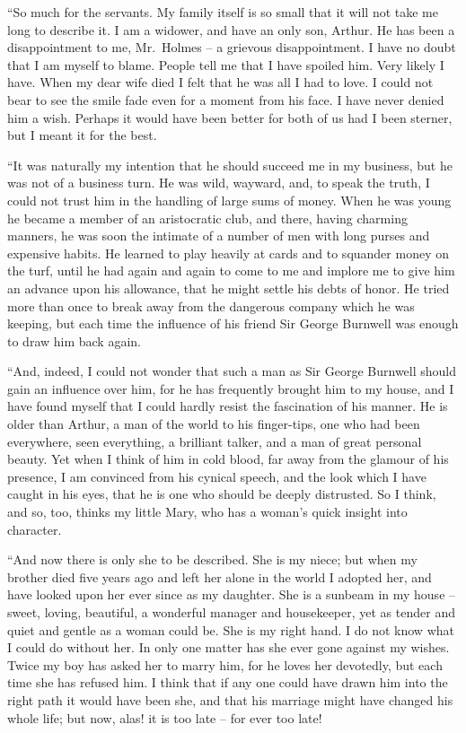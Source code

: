 “So much for the servants. My family itself is so small
that it will not take me long to describe it. I am a widower,
and have an only son, Arthur. He has been a disappointment
to me, Mr.~Holmes -- a grievous disappointment. I have
no doubt that I am myself to blame. People tell me that I
have spoiled him. Very likely I have. When my dear wife
died I felt that he was all I had to love. I could not bear to
see the smile fade even for a moment from his face. I have
never denied him a wish. Perhaps it would have been better
for both of us had I been sterner, but I meant it for the best.

“It was naturally my intention that he should succeed me
in my business, but he was not of a business turn. He was
wild, wayward, and, to speak the truth, I could not trust him
in the handling of large sums of money. When he was young
he became a member of an aristocratic club, and there, having
charming manners, he was soon the intimate of a number of
men with long purses and expensive habits. He learned to
play heavily at cards and to squander money on the turf,
until he had again and again to come to me and implore me
to give him an advance upon his allowance, that he might
settle his debts of honor. He tried more than once to break
away from the dangerous company which he was keeping, but
each time the influence of his friend Sir George Burnwell was
enough to draw him back again.

“And, indeed, I could not wonder that such a man as Sir
George Burnwell should gain an influence over him, for he
has frequently brought him to my house, and I have found myself
that I could hardly resist the fascination of his manner.
He is older than Arthur, a man of the world to his finger-tips,
one who had been everywhere, seen everything, a brilliant
talker, and a man of great personal beauty. Yet when I think
of him in cold blood, far away from the glamour of his presence,
I am convinced from his cynical speech, and the look
which I have caught in his eyes, that he is one who should
be deeply distrusted. So I think, and so, too, thinks my
little Mary, who has a woman’s quick insight into character.

“And now there is only she to be described. She is my
niece; but when my brother died five years ago and left her
alone in the world I adopted her, and have looked upon her
ever since as my daughter. She is a sunbeam in my house -- sweet,
loving, beautiful, a wonderful manager and
housekeeper, yet as tender and quiet and gentle as a woman could
be. She is my right hand. I do not know what I could do
without her. In only one matter has she ever gone against
my wishes. Twice my boy has asked her to marry him, for
he loves her devotedly, but each time she has refused him. I
think that if any one could have drawn him into the right path
it would have been she, and that his marriage might have
changed his whole life; but now, alas! it is too late -- for ever
too late!

